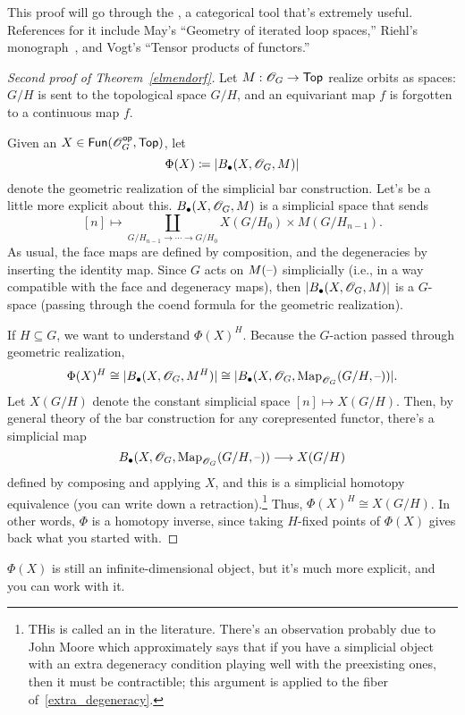 This proof will go through the , a categorical tool that's extremely useful. References for
it include May's ``Geometry of iterated loop spaces,'' Riehl's monograph~\cite{RiehlCHT}, and Vogt's ``Tensor
products of functors.''
\begin{proof}[Second proof of Theorem~\ref{elmendorf}]
Let $M:\mathscr O_G\to\mathsf{Top}$ realize orbits as spaces: $G/H$ is sent to the topological space $G/H$, and an equivariant map
$f$ is forgotten to a continuous map $f$.

Given an $X\in\mathsf{Fun}(\mathscr O_G^{\mathsf{op}}, \mathsf{Top})$, let
\[\Phi(X) \coloneqq \lvert B_\bullet(X, \mathscr O_G, M)\rvert\]
denote the geometric realization of the simplicial bar construction. Let's be a little more explicit about this.
$B_\bullet(X, \mathscr O_G, M)$ is a simplicial space that sends
\[[n]\mapsto \coprod_{G/H_{n-1}\to\dotsb\to G/H_0} X(G/H_0)\times M(G/H_{n-1}).\]
As usual, the face maps are defined by composition, and the degeneracies by inserting the identity map. Since $G$
acts on $M(\text{--})$ simplicially (i.e., in a way compatible with the face and degeneracy maps), then
$\lvert B_\bullet(X, \mathscr O_G, M)\rvert$ is a $G$-space (passing through the coend formula for the geometric realization).

If $H\subseteq G$, we want to understand $\Phi(X)^H$. Because the $G$-action passed through geometric realization,
\[\Phi(X)^H\cong \lvert B_\bullet(X, \mathscr O_G, M^H)\rvert\cong \lvert B_\bullet(X, \mathscr O_G, \operatorname{Map}_{\mathscr O_G}(G/H, \text{--}))\rvert.\]
Let $X(G/H)$ denote the constant simplicial space $[n]\mapsto X(G/H)$. Then, by general theory of the bar
construction for any corepresented functor, there's a simplicial map
\begin{equation}
\label{extra_degeneracy}
B_\bullet(X, \mathscr O_G, \operatorname{Map}_{\mathscr O_G}(G/H, \text{--}))\longrightarrow X(G/H)
\end{equation}
defined by composing and applying $X$, and this is a simplicial homotopy equivalence (you can write down a
retraction).\footnote{THis is called an  in the literature. There's an observation
probably due to John Moore which approximately says that if you have a simplicial object with an extra degeneracy
condition playing well with the preexisting ones, then it must be contractible; this argument is applied to the
fiber of~\eqref{extra_degeneracy}.} Thus, $\Phi(X)^H\cong X(G/H)$. In other words, $\Phi$ is a homotopy inverse,
since taking $H$-fixed points of $\Phi(X)$ gives back what you started with.
\end{proof}
$\Phi(X)$ is still an infinite-dimensional object, but it's much more explicit, and you can work with it.
